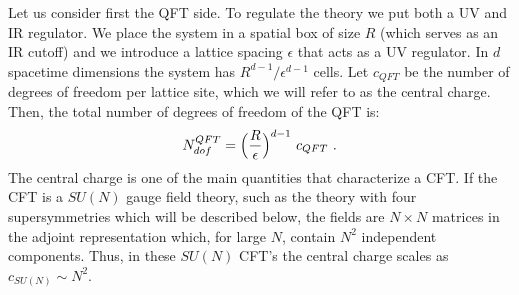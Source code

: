 \documentclass[12pt,notitlepage]{article}
\newcommand{\beq}{\begin{equation}}
\newcommand{\eeq}{\end{equation}}
\begin{document}
Let us consider first the QFT side. To regulate the theory we put both a UV and IR regulator. We place the system in a spatial box of size $R$ (which serves as an IR cutoff)  and we introduce a lattice spacing $\epsilon$ that acts as a UV regulator. In $d$ spacetime dimensions the system has $R^{d-1}/\epsilon^{d-1}$ cells. Let $c_{QFT}$ be the number of degrees of freedom per lattice site, which we will refer to as the central charge. Then, the total number of degrees of freedom of the QFT is:
\beq
N_{dof}^{QFT}= \Big({R\over \epsilon}\Big)^{d-1}\,\,c_{QFT}\,\,.
\eeq
The central charge is one of the main quantities that characterize a CFT. If the CFT is  a 
$SU(N)$ gauge field theory,  such as the theory with four supersymmetries which will be described below, the fields are $N\times N$ matrices in the adjoint representation which, for large $N$, contain $N^2$ independent components. Thus, in  these $SU(N)$ CFT's the central charge scales as  $c_{SU(N)}\sim N^2$.
\end{document}

